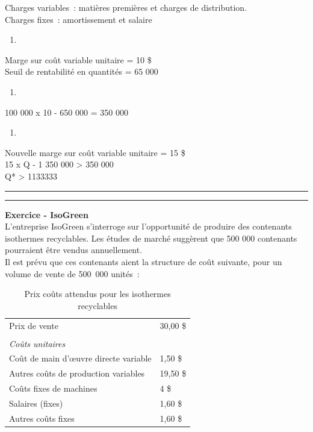 \documentclass{tufte-handout}
\begin{document}
\begin{enumerate}
\begin{enumerate}
\end{enumerate}
Charges variables : matières premières et charges de distribution.\\
Charges fixes : amortissement et salaire\\
\begin{enumerate}
\item 
\end{enumerate}
Marge sur coût variable unitaire = 10 \$\\
Seuil de rentabilité en quantités = 65 000\\
\begin{enumerate}
\item 
\end{enumerate}
100 000 x 10 - 650 000 = 350 000\\
\begin{enumerate}
\item 
\end{enumerate}
Nouvelle marge sur coût variable unitaire = 15 \$\\
15 x Q - 1 350 000 > 350 000\\
Q* > 1133333\\

\noindent\rule{\textwidth}{0.5pt}

\noindent\rule{\textwidth}{0.5pt}
\textbf{Exercice - IsoGreen}\\
L'entreprise IsoGreen s’interroge sur l’opportunité de produire des contenants isothermes recyclables. Les études de marché suggèrent que 500 000 contenants pourraient être vendus annuellement.\\

Il est prévu que ces contenants aient la structure de coût suivante, pour un volume de vente de 500 000 unités :\\

\begin{table}[htbp]
\caption{Prix coûts attendus pour les isothermes recyclables}
\centering
\begin{tabular}{ll}
Prix de vente & 30,00 \$\\
 & \\
\emph{Coûts unitaires} & \\
Coût de main d’œuvre directe variable & 1,50 \$\\
Autres coûts de production variables & 19,50 \$\\
Coûts fixes de machines & 4 \$\\
Salaires (fixes) & 1,60 \$\\
Autres coûts fixes & 1,60 \$\\
\end{tabular}
\end{table}


\end{enumerate}
\end{document}
